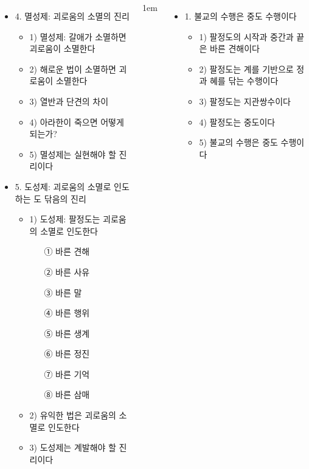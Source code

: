 \documentclass[	17pt, 
							a1paper, 
							portrait, %
							margin=0mm, %
							innermargin=10mm,  		%
							colspace=5mm, 
							subcolspace=0mm
							]{tikzposter}
\begin{document}
\begin{columns}
{\begin{itemize}
					\item 4. 멸성제: 괴로움의 소멸의 진리
						\begin{itemize}
						\item 1) 멸성제: 갈애가 소멸하면 괴로움이 소멸한다
						\item 2) 해로운 법이 소멸하면 괴로움이 소멸한다
						\item 3) 열반과 단견의 차이
						\item 4) 아라한이 죽으면 어떻게 되는가?
						\item 5) 멸성제는 실현해야 할 진리이다
						\end{itemize}

					\item 5. 도성제: 괴로움의 소멸로 인도하는 도 닦음의 진리
						\begin{itemize}
						\item 1) 도성제: 팔정도는 괴로움의 소멸로 인도한다
							\begin{itemize}
							\item [①] 바른 견해
							\item [②] 바른 사유
							\item [③] 바른 말
							\item [④] 바른 행위
							\item [⑤] 바른 생계
							\item [⑥] 바른 정진
							\item [⑦] 바른 기억
							\item [⑧] 바른 삼매
							\end{itemize}
						\item 2) 유익한 법은 괴로움의 소멸로 인도한다
						\item 3) 도성제는 계발해야 할 진리이다
						\end{itemize}

					\end{itemize}
			}





			{
					\setlength{\leftmargini}{2em}
					\setlength{\labelsep} {1em}
					\begin{itemize}
					\item 1. 불교의 수행은 중도 수행이다
						\begin{itemize}
						\item 1) 팔정도의 시작과 중간과 끝은 바른 견해이다
						\item 2) 팔정도는 계를 기반으로 정과 혜를 닦는 수행이다
						\item 3) 팔정도는 지관쌍수이다
						\item 4) 팔정도는 중도이다
						\item 5) 불교의 수행은 중도 수행이다
						\end{itemize}


\end{itemize}}
\end{columns}
\end{document}
